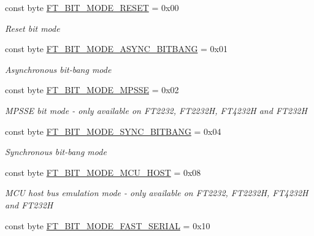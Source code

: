 \begin{DoxyCompactItemize}
\item 
const byte \mbox{\hyperlink{class_f_t_d2_x_x___n_e_t_1_1_f_t_d_i_1_1_f_t___b_i_t___m_o_d_e_s_a9bbf0be460490d3df5c4901597742ab5}{F\+T\+\_\+\+B\+I\+T\+\_\+\+M\+O\+D\+E\+\_\+\+R\+E\+S\+ET}} = 0x00
\begin{DoxyCompactList}\small\item\em Reset bit mode \end{DoxyCompactList}\item 
const byte \mbox{\hyperlink{class_f_t_d2_x_x___n_e_t_1_1_f_t_d_i_1_1_f_t___b_i_t___m_o_d_e_s_ad047a96bafb278a06532f82304ffb497}{F\+T\+\_\+\+B\+I\+T\+\_\+\+M\+O\+D\+E\+\_\+\+A\+S\+Y\+N\+C\+\_\+\+B\+I\+T\+B\+A\+NG}} = 0x01
\begin{DoxyCompactList}\small\item\em Asynchronous bit-\/bang mode \end{DoxyCompactList}\item 
const byte \mbox{\hyperlink{class_f_t_d2_x_x___n_e_t_1_1_f_t_d_i_1_1_f_t___b_i_t___m_o_d_e_s_a78a6452d9dd0775030addd604e2b2f86}{F\+T\+\_\+\+B\+I\+T\+\_\+\+M\+O\+D\+E\+\_\+\+M\+P\+S\+SE}} = 0x02
\begin{DoxyCompactList}\small\item\em M\+P\+S\+SE bit mode -\/ only available on F\+T2232, F\+T2232H, F\+T4232H and F\+T232H \end{DoxyCompactList}\item 
const byte \mbox{\hyperlink{class_f_t_d2_x_x___n_e_t_1_1_f_t_d_i_1_1_f_t___b_i_t___m_o_d_e_s_a71c1f579c745402b1c32fa8651374559}{F\+T\+\_\+\+B\+I\+T\+\_\+\+M\+O\+D\+E\+\_\+\+S\+Y\+N\+C\+\_\+\+B\+I\+T\+B\+A\+NG}} = 0x04
\begin{DoxyCompactList}\small\item\em Synchronous bit-\/bang mode \end{DoxyCompactList}\item 
const byte \mbox{\hyperlink{class_f_t_d2_x_x___n_e_t_1_1_f_t_d_i_1_1_f_t___b_i_t___m_o_d_e_s_af548b30240e6afdf99150e207de4b001}{F\+T\+\_\+\+B\+I\+T\+\_\+\+M\+O\+D\+E\+\_\+\+M\+C\+U\+\_\+\+H\+O\+ST}} = 0x08
\begin{DoxyCompactList}\small\item\em M\+CU host bus emulation mode -\/ only available on F\+T2232, F\+T2232H, F\+T4232H and F\+T232H \end{DoxyCompactList}\item 
const byte \mbox{\hyperlink{class_f_t_d2_x_x___n_e_t_1_1_f_t_d_i_1_1_f_t___b_i_t___m_o_d_e_s_a0087f3d1529241c57ec08cc3f31d9464}{F\+T\+\_\+\+B\+I\+T\+\_\+\+M\+O\+D\+E\+\_\+\+F\+A\+S\+T\+\_\+\+S\+E\+R\+I\+AL}} = 0x10

\end{DoxyCompactItemize}
